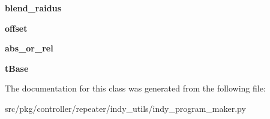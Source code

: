\begin{DoxyCompactItemize}
\item 
\mbox{\label{classrnb-planning_1_1src_1_1pkg_1_1controller_1_1repeater_1_1indy__utils_1_1indy__program__maker_1_1_move_param_a43d195025ec22ad673ad8195510cb125}} 
{\bfseries blend\+\_\+raidus}
\item 
\mbox{\label{classrnb-planning_1_1src_1_1pkg_1_1controller_1_1repeater_1_1indy__utils_1_1indy__program__maker_1_1_move_param_a7b74bc57a012c502481a26f7baba0306}} 
{\bfseries offset}
\item 
\mbox{\label{classrnb-planning_1_1src_1_1pkg_1_1controller_1_1repeater_1_1indy__utils_1_1indy__program__maker_1_1_move_param_ad7f52f2d320b185cb759a9a7d4a89696}} 
{\bfseries abs\+\_\+or\+\_\+rel}
\item 
\mbox{\label{classrnb-planning_1_1src_1_1pkg_1_1controller_1_1repeater_1_1indy__utils_1_1indy__program__maker_1_1_move_param_aa53392f2273abe611bd54ce81d33178d}} 
{\bfseries t\+Base}
\end{DoxyCompactItemize}


The documentation for this class was generated from the following file\+:\begin{DoxyCompactItemize}
\item 
src/pkg/controller/repeater/indy\+\_\+utils/indy\+\_\+program\+\_\+maker.\+py\end{DoxyCompactItemize}
